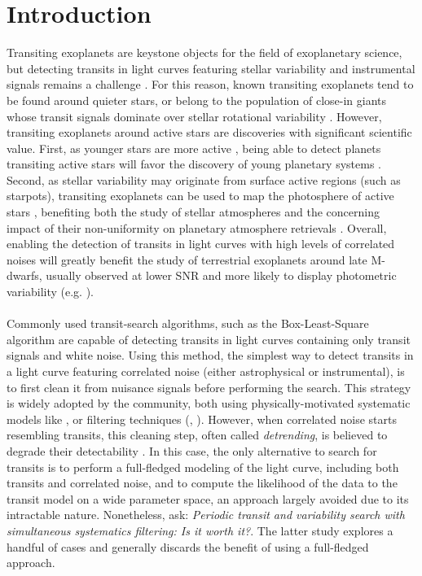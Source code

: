 \documentclass[modern]{aastex631}
\begin{document}
\section*{Introduction}
Transiting exoplanets are keystone objects for the field of exoplanetary science, but detecting transits in light curves featuring stellar variability and instrumental signals remains a challenge \citep{Pont2006,Howell2016}. For this reason, known transiting exoplanets tend to be found around quieter stars, or belong to the population of close-in giants whose transit signals dominate over stellar rotational variability \citep{Simpson2023}. However, transiting exoplanets around active stars are discoveries with significant scientific value. First, as younger stars are more active \citep{Skumanich1972}, being able to detect planets transiting active stars will favor the discovery of young planetary systems \citep[e.g.][]{Newton2022}. Second, as stellar variability may originate from surface active regions (such as starpots), transiting exoplanets can be used to map the photosphere of active stars \citep[e.g.][]{Morris2017}, benefiting both the study of stellar atmospheres and the concerning impact of their non-uniformity on planetary atmosphere retrievals \citep{rackham2018}. Overall, enabling the detection of transits in light curves with high levels of correlated noises will greatly benefit the study of terrestrial exoplanets around late M-dwarfs, usually observed at lower SNR and more likely to display photometric variability (e.g. \citealt{Murray2020}).
\\\\
Commonly used transit-search algorithms, such as the Box-Least-Square algorithm \citep[BLS,][]{bls} are capable of detecting transits in light curves containing only transit signals and white noise. Using this method, the simplest way to detect transits in a light curve featuring correlated noise (either astrophysical or instrumental), is to first clean it from nuisance signals before performing the search. This strategy is widely adopted by the community, both using physically-motivated systematic models like \cite{everest1, everest2}, or filtering techniques (\citealt{Jenkins2010}, \citealt{wotan}). However, when correlated noise starts resembling transits, this cleaning step, often called \textit{detrending}, is believed to degrade their detectability \cite[see subsection 4.3 of][]{wotan}. In this case, the only alternative to search for transits is to perform a full-fledged modeling of the light curve, including both transits and correlated noise, and to compute the likelihood of the data to the transit model on a wide parameter space, an approach largely avoided due to its intractable nature. Nonetheless, \cite{kovacs2016} ask: \textit{Periodic transit and variability search with simultaneous systematics filtering: Is it worth it?}. The latter study explores a handful of cases and generally discards the benefit of using a full-fledged approach.\\\\
\end{document}
